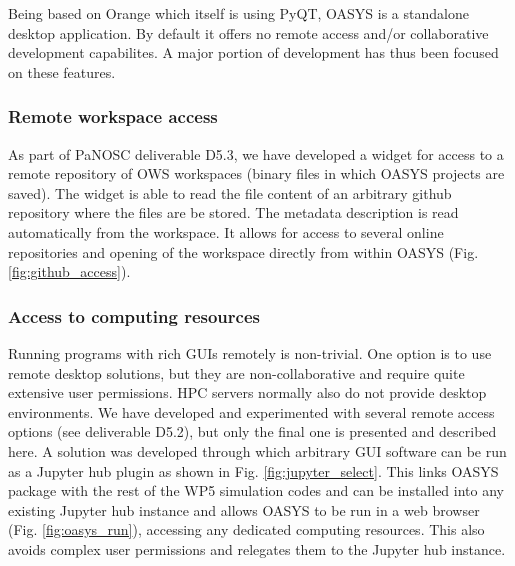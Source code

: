 \documentclass[11pt, a4paper]{article}
\begin{document}
Being based on Orange which itself is using PyQT, OASYS is a standalone desktop application. By default it offers no remote access and/or collaborative development capabilites. A major portion of development has thus been focused on these features.

\subsubsection{Remote workspace access}

As part of PaNOSC deliverable D5.3, we have developed a widget for access to a remote repository of OWS workspaces (binary files in which OASYS projects are saved). The widget is able to read the file content of an arbitrary github repository where the files are be stored. The metadata description is read automatically from the workspace. It allows for access to several online repositories and opening of the workspace directly from within OASYS (Fig. \ref{fig:github_access}).

\subsubsection{Access to computing resources}
\label{sec:docker}

Running programs with rich GUIs remotely is non-trivial. One option is to use remote desktop solutions, but they are non-collaborative and require quite extensive user permissions. HPC servers normally also do not provide desktop environments. We have developed and experimented with several remote access options (see deliverable D5.2), but only the final one is presented and described here. A solution was developed through which arbitrary GUI software can be run as a Jupyter hub plugin as shown in Fig. \ref{fig:jupyter_select}. This links OASYS package with the rest of the WP5 simulation codes and can be installed into any existing Jupyter hub instance and allows OASYS to be run in a web browser (Fig. \ref{fig:oasys_run}), accessing any dedicated computing resources. This also avoids complex user permissions and relegates them to the Jupyter hub instance.
\end{document}
